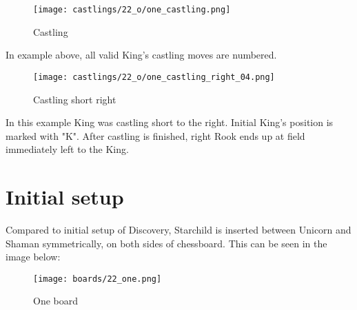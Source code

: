 \noindent
\begin{figure}[!h]
\texttt{[image: castlings/22\_o/one\_castling.png]}
\caption{Castling}
\label{fig:one_castling}
\end{figure}

In example above, all valid King's castling moves are numbered.

\noindent
\begin{figure}[!h]
\texttt{[image: castlings/22\_o/one\_castling\_right\_04.png]}
\caption{Castling short right}
\label{fig:one_castling_right_04}
\end{figure}

In this example King was castling short to the right. Initial King's position is marked with "K".
After castling is finished, right Rook ends up at field immediately left to the King.

\clearpage %

\section*{Initial setup}

Compared to initial setup of Discovery, Starchild is inserted between Unicorn and Shaman
symmetrically, on both sides of chessboard. This can be seen in the image below:

\noindent
\begin{figure}[h]
\texttt{[image: boards/22\_one.png]}
\caption{One board}
\label{fig:22_one}
\end{figure}

\clearpage %
